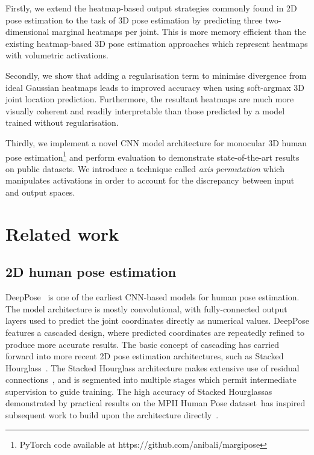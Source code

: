 \documentclass[australian,10pt,twocolumn,letterpaper,twocolumn]{article}
\makeatletter
\renewcommand{\paragraph}{\@startsection{paragraph}{4}{\z@}{0.7ex \@plus 0.2ex \@minus 0.2ex}{-1em}{\normalfont\normalsize\bfseries}}
\makeatother
\begin{document}
\smallskip{}


\paragraph{Our contributions.}

Firstly, we extend the heatmap-based output strategies commonly found
in 2D pose estimation to the task of 3D pose estimation by predicting
three two-dimensional marginal heatmaps per joint. This is more memory
efficient than the existing heatmap-based 3D pose estimation approaches
which represent heatmaps with volumetric activations.

Secondly, we show that adding a regularisation term to minimise divergence
from ideal Gaussian heatmaps leads to improved accuracy when using
soft-argmax 3D joint location prediction. Furthermore, the resultant
heatmaps are much more visually coherent and readily interpretable
than those predicted by a model trained without regularisation.

Thirdly, we implement a novel CNN model architecture for monocular
3D human pose estimation\footnote{PyTorch code available at https://github.com/anibali/margipose}
and perform evaluation to demonstrate state-of-the-art results on
public datasets. We introduce a technique called \emph{axis permutation}
which manipulates activations in order to account for the discrepancy
between input and output spaces.

\section{Related work}

\subsection{2D human pose estimation}

DeepPose~\citep{toshev2014deeppose} is one of the earliest CNN-based
models for human pose estimation. The model architecture is mostly
convolutional, with fully-connected output layers used to predict
the joint coordinates directly as numerical values. DeepPose features
a cascaded design, where predicted coordinates are repeatedly refined
to produce more accurate results. The basic concept of cascading has
carried forward into more recent 2D pose estimation architectures,
such as Stacked Hourglass~\citep{newell2016stacked}. The Stacked
Hourglass architecture makes extensive use of residual connections~\citep{he2016deep},
and is segmented into multiple stages which permit intermediate supervision
to guide training. The high accuracy of Stacked Hourglass\textemdash as
demonstrated by practical results on the MPII Human Pose dataset~\citep{andriluka20142d}\textemdash has
inspired subsequent work to build upon the architecture directly~\citep{yang2017learning,chen2017advposenet,chou2017self,chu2017multi}.
\end{document}

